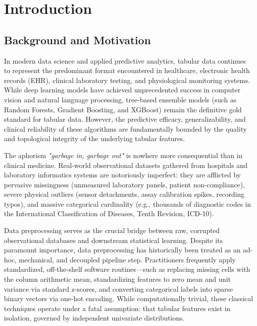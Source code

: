 \documentclass[MTech]{ugthesis}
\begin{document}
\pagebreak
\clearpage


\chapter{Introduction}
\label{chap:intro}

\section{Background and Motivation}
In modern data science and applied predictive analytics, tabular data continues to represent the predominant format encountered in healthcare, electronic health records (\ac{EHR}), clinical laboratory testing, and physiological monitoring systems. While deep learning models have achieved unprecedented success in computer vision and natural language processing, tree-based ensemble models (such as Random Forests, Gradient Boosting, and XGBoost) remain the definitive gold standard for tabular data. However, the predictive efficacy, generalizability, and clinical reliability of these algorithms are fundamentally bounded by the quality and topological integrity of the underlying tabular features.

The aphorism \textit{"garbage in, garbage out"} is nowhere more consequential than in clinical medicine. Real-world observational datasets gathered from hospitals and laboratory informatics systems are notoriously imperfect: they are afflicted by pervasive missingness (unmeasured laboratory panels, patient non-compliance), severe physical outliers (sensor detachments, assay calibration spikes, recording typos), and massive categorical cardinality (e.g., thousands of diagnostic codes in the International Classification of Diseases, Tenth Revision, ICD-10).

Data preprocessing serves as the crucial bridge between raw, corrupted observational databases and downstream statistical learning. Despite its paramount importance, data preprocessing has historically been treated as an ad-hoc, mechanical, and decoupled pipeline step. Practitioners frequently apply standardized, off-the-shelf software routines—such as replacing missing cells with the column arithmetic mean, standardizing features to zero mean and unit variance via standard z-scores, and converting categorical labels into sparse binary vectors via one-hot encoding. While computationally trivial, these classical techniques operate under a fatal assumption: that tabular features exist in isolation, governed by independent univariate distributions.
\end{document}
